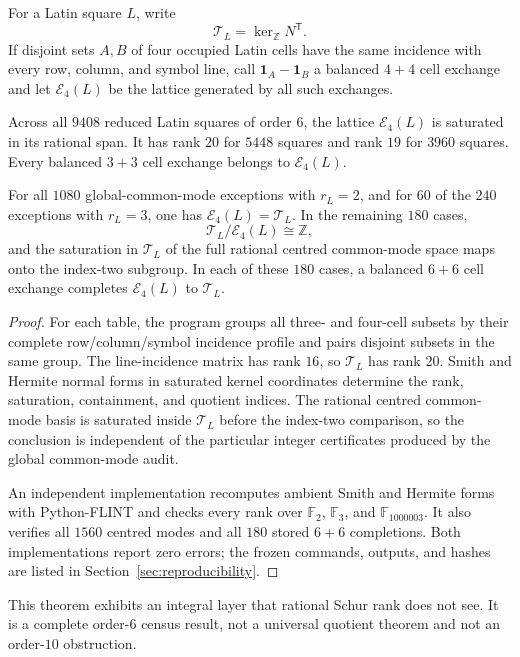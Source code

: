 For a Latin square $L$, write
\[
 \mathcal T_L=\ker_{\mathbb Z}N^{\mathsf T}.
\]
If disjoint sets $A,B$ of four occupied Latin cells have the same incidence
with every row, column, and symbol line, call
$\mathbf1_A-\mathbf1_B$ a balanced $4+4$ cell exchange and let
$\mathcal E_4(L)$ be the lattice generated by all such exchanges.

\begin{computationaltheorem}
\label{cthm:order6-common-mode-lattice}
Across all $9408$ reduced Latin squares of order $6$, the lattice
$\mathcal E_4(L)$ is saturated in its rational span.  It has rank $20$ for
$5448$ squares and rank $19$ for $3960$ squares.  Every balanced $3+3$ cell
exchange belongs to $\mathcal E_4(L)$.

For all $1080$ global-common-mode exceptions with $r_L=2$, and for $60$ of
the $240$
exceptions with $r_L=3$, one has $\mathcal E_4(L)=\mathcal T_L$.  In the
remaining $180$ cases,
\[
 \mathcal T_L/\mathcal E_4(L)\cong\mathbb Z,
\]
and the saturation in $\mathcal T_L$ of the full rational centred
common-mode space maps onto the index-two subgroup.  In each of these $180$
cases, a balanced $6+6$ cell exchange completes $\mathcal E_4(L)$ to
$\mathcal T_L$.
\end{computationaltheorem}

\begin{proof}
For each table, the program groups all three- and four-cell subsets by their
complete row/column/symbol incidence profile and pairs disjoint subsets in
the same group.  The line-incidence matrix has rank $16$, so
$\mathcal T_L$ has rank $20$.  Smith and Hermite normal forms in saturated
kernel coordinates determine the rank, saturation, containment, and quotient
indices.  The rational centred common-mode basis is saturated inside
$\mathcal T_L$ before the index-two comparison, so the conclusion is
independent of the particular integer certificates produced by the global
common-mode audit.

An independent implementation recomputes ambient Smith and Hermite forms
with Python-FLINT and checks every rank over $\mathbb F_2$, $\mathbb F_3$,
and $\mathbb F_{1000003}$.  It also verifies all $1560$ centred modes and
all $180$ stored $6+6$ completions.  Both implementations report zero
errors; the frozen commands, outputs, and hashes are listed in
Section~\ref{sec:reproducibility}.
\end{proof}

This theorem exhibits an integral layer that rational Schur rank does not
see.  It is a complete order-$6$ census result, not a universal quotient
theorem and not an order-$10$ obstruction.

